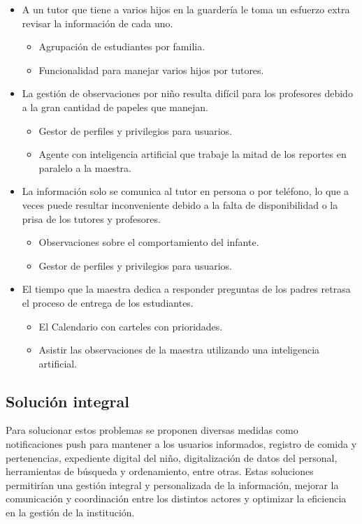 \documentclass{article}
\begin{document}
\begin{itemize}
	      \begin{itemize}
		      \item A un tutor que tiene a varios hijos en la guardería le toma un esfuerzo extra revisar la información de cada uno.
		            \begin{itemize}
			            \item Agrupación de estudiantes por familia.
			            \item Funcionalidad para manejar varios hijos por tutores.
		            \end{itemize}
		      \item La gestión de observaciones por niño resulta difícil para los profesores debido a la gran cantidad de papeles que manejan.
		            \begin{itemize}
			            \item Gestor de perfiles y privilegios para usuarios.
			            \item Agente con inteligencia artificial que trabaje la mitad de los reportes en paralelo a la maestra.

		            \end{itemize}
		      \item La información solo se comunica al tutor en persona o por teléfono, lo que a veces puede resultar inconveniente debido a la falta de disponibilidad o la prisa de los tutores y profesores.
		            \begin{itemize}
			            \item Observaciones sobre el comportamiento del infante.
			            \item Gestor de perfiles y privilegios para usuarios.
		            \end{itemize}
		      \item El tiempo que la maestra dedica a responder preguntas de los padres retrasa el proceso de entrega de los estudiantes.
		            \begin{itemize}
			            \item El Calendario con carteles con prioridades.
			            \item Asistir las observaciones de la maestra utilizando una inteligencia artificial.
		            \end{itemize}
	      \end{itemize}
\end{itemize}

\subsection{Solución integral}
Para solucionar estos problemas se proponen diversas medidas como notificaciones push para mantener a los usuarios informados, registro de comida y pertenencias, expediente digital del niño, digitalización de datos del personal, herramientas de búsqueda y ordenamiento, entre otras. Estas soluciones permitirían una gestión integral y personalizada de la información, mejorar la comunicación y coordinación entre los distintos actores y optimizar la eficiencia en la gestión de la institución.
\end{document}
